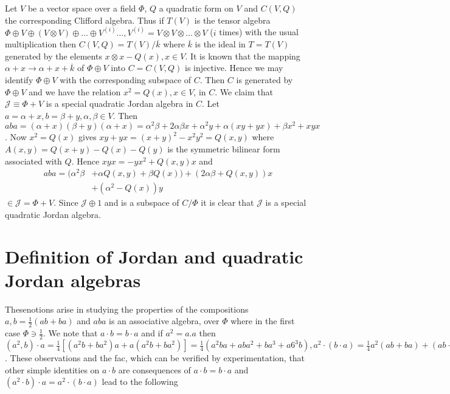 Let $V$ be a vector space over a field $\Phi$, $Q$ a quadratic form on
$V$ and $C(V,Q)$ the corresponding Clifford algebra. Thus if $T(V)$ is
the tensor algebra $\Phi\oplus V\oplus(V\otimes V)\oplus\ldots\oplus
V^{(i)}\ldots, V^{(i)}=V\otimes V\otimes\ldots \otimes V$ ($i$ times)
with the usual multiplication then $C(V,Q)=T(V)/\overline{k}$ where
$\overline{k}$ is the ideal in $T=T(V)$ generated by the elements
$x\otimes x-Q(x),x\in V$. It is known that the mapping $\alpha + x\to
\alpha +x +\overline{k}$ of $\Phi \oplus V$ into $C=C(V,Q)$ is
injective. Hence we may identify $\Phi\oplus V$ with the corresponding
subspace of $C$. Then $C$ is generated by $\Phi \oplus V$ and we have
the relation $x^{2}=Q(x),x\in V$, in $C$. We claim that
$\mathscr{J}\equiv\Phi+V$ is a special quadratic Jordan algebra in
$C$. Let $a=\alpha+x, b=\beta+y, \alpha, \beta \in V$. Then
$aba=(\alpha+x)(\beta+y)(\alpha+x)=\alpha^{2}\beta+2\alpha\beta
x+\alpha^{2}y+\alpha(xy+yx)+\beta x^{2}+xyx$. Now $x^{2}=Q(x)$ gives
$xy+yx=(x+y)^{2}-x^{2}y^{2}=Q(x,y)$ where $A(x,y)=Q(x+y)-Q(x)-Q(y)$ is
the symmetric bilinear form associated with $Q$. Hence
$xyx=-yx^{2}+Q(x,y)x$ and  
\begin{align*}
  aba=(\alpha^{2}\beta&+\alpha Q(x,y)+\beta Q(x))+(2\alpha\beta +Q(x,y))x\\
  &+(\alpha^{2}-Q(x))y\tag{2}\label{c1:eq2}
\end{align*}
$\in \mathscr{J}=\Phi+V$. Since $\mathscr{J}\oplus 1$ and is a
subspace of $C/\Phi$ it is clear that $\mathscr{J}$ is a special
quadratic Jordan algebra. 

\section{Definition of Jordan and quadratic Jordan algebras}\label{c1:sec2}

These\pageoriginale notions arise in studying the properties of the compositions
$a,b=\frac{1}{2}(ab+ba)$ and $aba$ is an associative algebra, over
$\Phi$ where in the first case $\Phi\ni\frac{1}{2}$. We note that
$a\cdot b=b\cdot a$ and if $a^{2}=a.a$ then $(a^{2},b)\cdot
a=\frac{1}{4}[(a^{2}b+ba^{2})a+a(a^{2}b+ba^{2})]
=\frac{1}{4}(a^{2}ba+aba^{2}+ba^{3}+a6^{3}b), 
a^{2}\cdot(b\cdot a)=\frac{1}{4}
a^{2}(ab+ba)+(ab+ba)a^{2}=\frac{1}{4}(a^{3}b+ba^{3}+a^{2}ba+aba^{2})$. These
observations and the fac, which can be verified by
experimentation, that other simple identities on $a\cdot b$ are
consequences of $a\cdot b=b\cdot a$ and $(a^{2}\cdot b)\cdot
a=a^{2}\cdot(b\cdot a)$ lead to the following 


